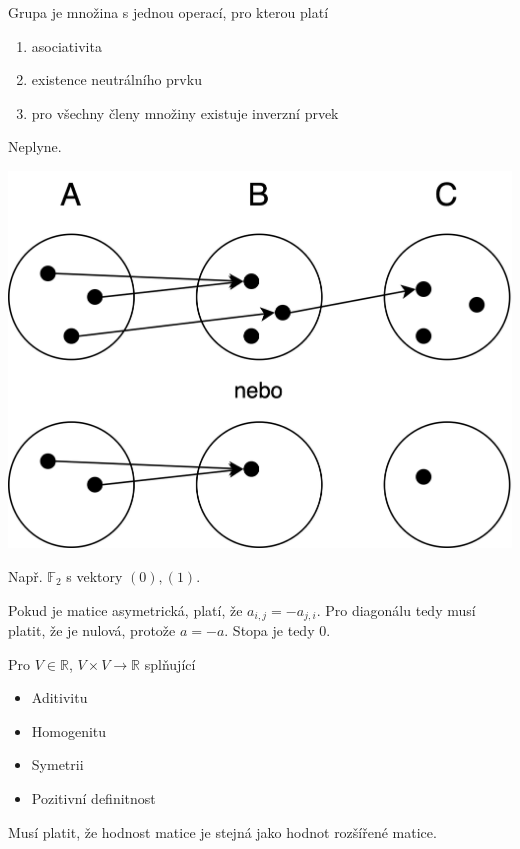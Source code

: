 \begin{questions}

{\color{gray}

\question Grupa je množina s jednou operací, pro kterou platí
\begin{enumerate}
    \item asociativita
    \item existence neutrálního prvku
    \item pro všechny členy množiny existuje inverzní prvek
\end{enumerate}

\question Neplyne.

\begin{center}
    \includegraphics[scale=0.1]{figures/2022-0-2.drawio.png}
\end{center}

\question Např. \(\mathbb{F}_2\) s vektory \((0), (1)\).

\question Pokud je matice asymetrická, platí, že \(a_{i,j} = -a_{j,i}\). Pro diagonálu tedy musí platit, že je nulová, protože \(a = -a\). Stopa je tedy 0.

\question Pro \(V \in \mathbb{R}\), \(V \times V \rightarrow \mathbb{R}\) splňující \begin{itemize}
    \item Aditivitu
    \item Homogenitu
    \item Symetrii
    \item Pozitivní definitnost
\end{itemize}

\question Musí platit, že hodnost matice je stejná jako hodnot rozšířené matice.

}

\end{questions}
